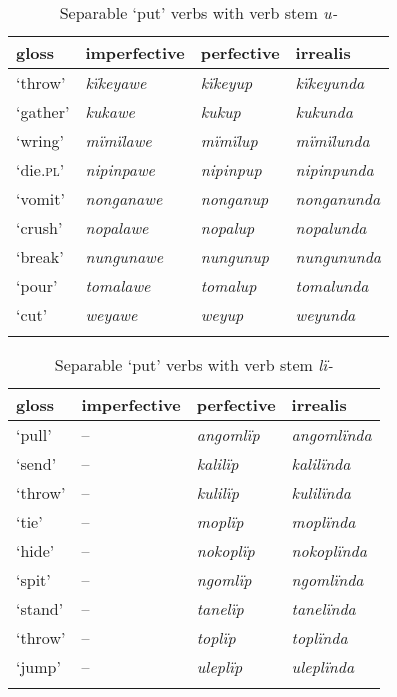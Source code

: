 \begin{table}
\caption{Separable ‘put’ verbs with verb stem \textit{u-}}
\label{tab::9.1}
\begin{tabularx}{\textwidth}{QQQQ}
\lsptoprule
gloss & imperfective & perfective & irrealis\\
\midrule
‘throw’ & {\itshape kïkeyawe} & {\itshape kïkeyup} & {\itshape kïkeyunda}\\
‘gather’ & {\itshape kukawe} & {\itshape kukup} & {\itshape kukunda}\\
‘wring’ & {\itshape mïmïlawe} & {\itshape mïmïlup} & {\itshape mïmïlunda}\\
‘die.\textsc{pl}’ & {\itshape nipinpawe} & {\itshape nipinpup} & {\itshape nipinpunda}\\
‘vomit’ & {\itshape nonganawe} & {\itshape nonganup} & {\itshape nonganunda}\\
‘crush’ & {\itshape nopalawe} & {\itshape nopalup} & {\itshape nopalunda}\\
‘break’ & {\itshape nungunawe} & {\itshape nungunup} & {\itshape nungununda}\\
‘pour’ & {\itshape tomalawe} & {\itshape tomalup} & {\itshape tomalunda}\\
‘cut’ & {\itshape weyawe} & {\itshape weyup} & {\itshape weyunda}\\
\lspbottomrule
\end{tabularx}
\end{table}


\begin{table}
\caption{Separable ‘put’ verbs with verb stem \textit{lï-}}
\label{tab::9.2}
\begin{tabularx}{\textwidth}{QQQQ}
\lsptoprule
gloss & imperfective & perfective & irrealis\\
\midrule
‘pull’ & {--} & {\itshape angomlïp} & {\itshape angomlïnda}\\
‘send’ & {--} & {\itshape kalilïp} & {\itshape kalilïnda}\\
‘throw’ & {--} & {\itshape kulilïp} & {\itshape kulilïnda}\\
‘tie’ & {--} & {\itshape moplïp} & {\itshape moplïnda}\\
‘hide’ & {--} & {\itshape nokoplïp} & {\itshape nokoplïnda}\\
‘spit’ & {--} & {\itshape ngomlïp} & {\itshape ngomlïnda}\\
‘stand’ & {--} & {\itshape tanelïp} & {\itshape tanelïnda}\\
‘throw’ & {--} & {\itshape toplïp} & {\itshape toplïnda}\\
‘jump’ & {--} & {\itshape uleplïp} & {\itshape uleplïnda}\\
\lspbottomrule
\end{tabularx}
\end{table}

